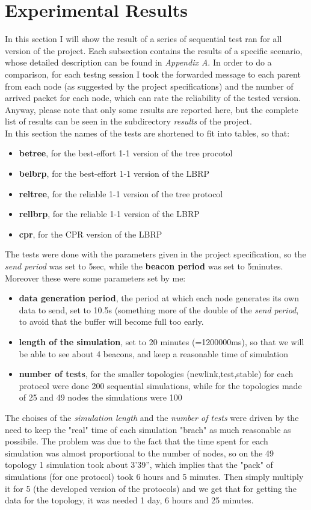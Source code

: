\documentclass{article}
\begin{document}
\section{Experimental Results}
	In this section I will show the result of a series of sequential test ran for all version of the project. Each subsection contains the results of a specific scenario, whose detailed description can be found in \emph{Appendix A}. In order to do a comparison, for each testng session I took the forwarded message to each parent from each node (as suggested by the project specifications) and the number of arrived packet for each node, which can rate the reliability of the tested version. Anyway, please note that only some results are reported here, but the complete list of results can be seen in the subdirectory \textit{results} of the project.
\\In this section the names of the tests are shortened to fit into tables, so that:
	\begin{itemize}
		\item \textbf{betree}, for the best-effort 1-1 version of the tree procotol
		\item \textbf{belbrp}, for the best-effort 1-1 version of the LBRP
		\item \textbf{reltree}, for the reliable 1-1 version of the tree protocol
		\item \textbf{rellbrp}, for the reliable 1-1 version of the LBRP
		\item \textbf{cpr}, for the CPR version of the LBRP
	\end{itemize}
The tests were done with the parameters given in the project specification, so the \emph{send period} was set to 5sec, while the \textbf{beacon period} was set to 5minutes. Moreover these were some parameters set by me:
	\begin{itemize}
		\item \textbf{data generation period}, the period at which each node generates its own data to send, set to 10.5s (something more of the double of the \textit{send period}, to avoid that the buffer will become full too early.
		\item \textbf{length of the simulation}, set to 20 minutes (=1200000ms), so that we will be able to see about 4 beacons, and keep a reasonable time of simulation
		\item \textbf{number of tests}, for the smaller topologies (newlink,test,stable) for each protocol were done 200 sequential simulations, while for the topologies made of 25 and 49 nodes the simulations were 100
	\end{itemize}
The choises of the \textit{simulation length} and the \textit{number of tests} were driven by the need to keep the "real" time of each simulation "brach" as much reasonable as possibile. The problem was due to the fact that the time spent for each simulation was almost proportional to the number of nodes, so on the 49 topology 1 simulation took about 3'39'', which implies that the "pack" of simulations (for one protocol) took 6 hours and 5 minutes. Then simply multiply it for 5 (the developed version of the protocols) and we get that for getting the data for the topology, it was needed 1 day, 6 hours and 25 minutes.
\end{document}
